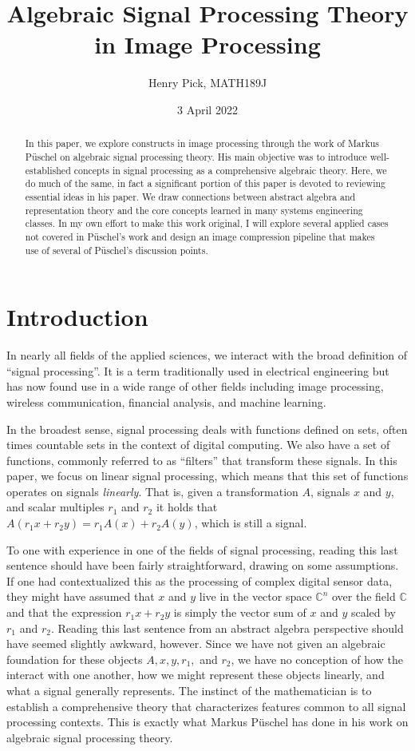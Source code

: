 \documentclass[12pt,technote]{IEEEtran}
\author{Henry Pick, MATH189J}
\title{Algebraic Signal Processing Theory in Image Processing}
\date{3 April 2022}
\begin{document}
\maketitle
\begin{abstract}
    In this paper, we explore constructs in image processing through the work of Markus P\"uschel on algebraic signal processing theory. His main objective was to introduce well-established concepts in signal processing as a comprehensive algebraic theory. Here, we do much of the same, in fact a significant portion of this paper is devoted to reviewing essential ideas in his paper. We draw connections between abstract algebra and representation theory and the core concepts learned in many systems engineering classes. In my own effort to make this work original, I will explore several applied cases not covered in P\"uschel's work and design an image compression pipeline that makes use of several of P\"uschel's discussion points.
\end{abstract}
\section{Introduction}
In nearly all fields of the applied sciences, we interact with the broad definition of ``signal processing''. It is a term traditionally used in electrical engineering but has now found use in a wide range of other fields including image processing, wireless communication, financial analysis, and machine learning.

In the broadest sense, signal processing deals with functions defined on sets, often times countable sets in the context of digital computing. We also have a set of functions, commonly referred to as ``filters'' that transform these signals. In this paper, we focus on linear signal processing, which means that this set of functions operates on signals \textit{linearly}. That is, given a transformation $A$, signals $x$ and $y$, and scalar multiples $r_1$ and $r_2$ it holds that $A(r_1x + r_2y) = r_1A(x) + r_2A(y)$, which is still a signal.

To one with experience in one of the fields of signal processing, reading this last sentence should have been fairly straightforward, drawing on some assumptions. If one had contextualized this as the processing of complex digital sensor data, they might have assumed that $x$ and $y$ live in the vector space $\mathbb{C}^n$ over the field $\mathbb{C}$ and that the expression $r_1x + r_2y$ is simply the vector sum of $x$ and $y$ scaled by $r_1$ and $r_2$. Reading this last sentence from an abstract algebra perspective should have seemed slightly awkward, however. Since we have not given an algebraic foundation for these objects $A, x, y, r_1,$ and $r_2$, we have no conception of how the interact with one another, how we might represent these objects linearly, and what a signal generally represents. The instinct of the mathematician is to establish a comprehensive theory that characterizes features common to all signal processing contexts. This is exactly what Markus P\"uschel has done in his work on algebraic signal processing theory\cite{AlgebraicSignalProcessing2006}.
\end{document}
